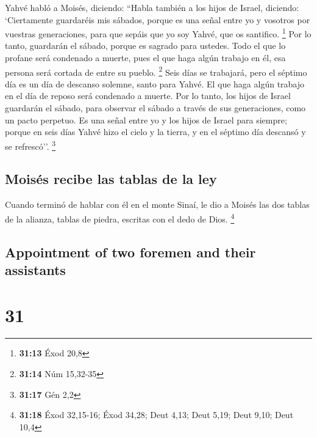 \begin{paracol}{2}
 Yahvé habló a Moisés, diciendo:  ``Habla
también a los hijos de Israel, diciendo: `Ciertamente guardaréis mis
sábados, porque es una señal entre yo y vosotros por vuestras
generaciones, para que sepáis que yo soy Yahvé, que os santifico.
\footnote{\textbf{31:13} Éxod 20,8}  Por lo tanto,
guardarán el sábado, porque es sagrado para ustedes. Todo el que lo
profane será condenado a muerte, pues el que haga algún trabajo en él,
esa persona será cortada de entre su pueblo. \footnote{\textbf{31:14}
  Núm 15,32-35}  Seis días se trabajará, pero el séptimo
día es un día de descanso solemne, santo para Yahvé. El que haga algún
trabajo en el día de reposo será condenado a muerte.  Por
lo tanto, los hijos de Israel guardarán el sábado, para observar el
sábado a través de sus generaciones, como un pacto perpetuo.
 Es una señal entre yo y los hijos de Israel para
siempre; porque en seis días Yahvé hizo el cielo y la tierra, y en el
séptimo día descansó y se refrescó''. \footnote{\textbf{31:17} Gén 2,2}

\hypertarget{moisuxe9s-recibe-las-tablas-de-la-ley}{%
\subsection{Moisés recibe las tablas de la
ley}\label{moisuxe9s-recibe-las-tablas-de-la-ley}}

 Cuando terminó de hablar con él en el monte Sinaí, le
dio a Moisés las dos tablas de la alianza, tablas de piedra, escritas
con el dedo de Dios. \footnote{\textbf{31:18} Éxod 32,15-16; Éxod 34,28;
  Deut 4,13; Deut 5,19; Deut 9,10; Deut 10,4}

\switchcolumn
\begin{otherlanguage}{english}

\hypertarget{appointment-of-two-foremen-and-their-assistants}{%
\subsection{Appointment of two foremen and their
assistants}\label{appointment-of-two-foremen-and-their-assistants}}

\hypertarget{section-61}{%
\section{31}\label{section-61}}


\end{otherlanguage}
\end{paracol}
